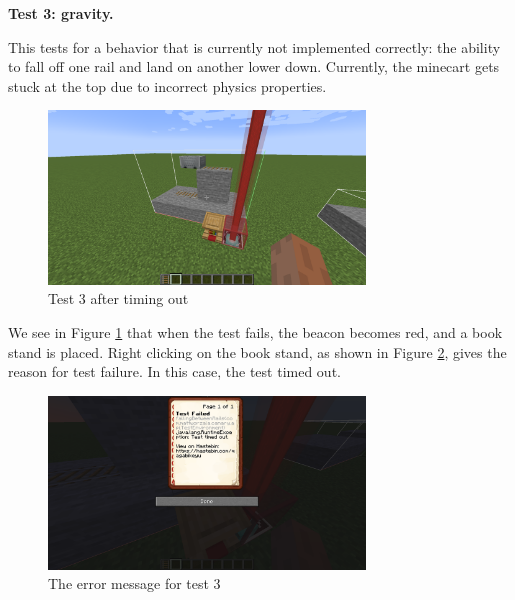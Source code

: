 \documentclass[12pt]{article}
\begin{document}
\begin{onehalfspacing}
\noindent\textbf{Test 3: gravity.}

This tests for a behavior that is currently not implemented correctly:
the ability to fall off one rail and land on another lower down.
Currently, the minecart gets stuck at the top due to incorrect physics
properties.
\begin{figure}[H] 
    \centering
    \includegraphics[width=0.75\textwidth]{media/media/image10.png} 
    \caption{Test 3 after timing out} 
    \label{fig:5_1_1_3}  
\end{figure}


We see in Figure \ref{fig:5_1_1_3} that when the test fails, the beacon becomes
red, and a book stand is placed. Right clicking on the book stand, as
shown in Figure \ref{fig:5_1_1_4}, gives the reason for test failure. In this
case, the test timed out.

\begin{figure}[H] 
    \centering
    \includegraphics[width=0.75\textwidth]{media/media/image14.png} 
    \caption[The error message for test 3]%
    {The error message for test 3\footnotemark} 

    \label{fig:5_1_1_4}  
\end{figure}


\end{onehalfspacing}
\end{document}
